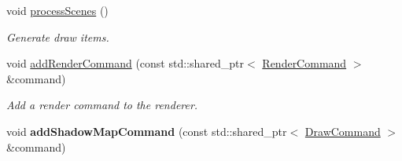 \begin{Indent}
\begin{DoxyCompactItemize}
\mbox{\label{classrev_1_1_main_renderer_a695025b3be3900f908bdbfad49b9bff3}} 
void \mbox{\hyperlink{classrev_1_1_main_renderer_a695025b3be3900f908bdbfad49b9bff3}{process\+Scenes}} ()
\begin{DoxyCompactList}\small\item\em Generate draw items. \end{DoxyCompactList}\item 
\mbox{\label{classrev_1_1_main_renderer_a488848fef9721e81947dee65e9dce720}} 
void \mbox{\hyperlink{classrev_1_1_main_renderer_a488848fef9721e81947dee65e9dce720}{add\+Render\+Command}} (const std\+::shared\+\_\+ptr$<$ \mbox{\hyperlink{classrev_1_1_render_command}{Render\+Command}} $>$ \&command)
\begin{DoxyCompactList}\small\item\em Add a render command to the renderer. \end{DoxyCompactList}\item 
\mbox{\label{classrev_1_1_main_renderer_a6c69bebce9647f9a1f8bd1fa35329b49}} 
void {\bfseries add\+Shadow\+Map\+Command} (const std\+::shared\+\_\+ptr$<$ \mbox{\hyperlink{classrev_1_1_draw_command}{Draw\+Command}} $>$ \&command)
\end{DoxyCompactItemize}
\end{Indent}
